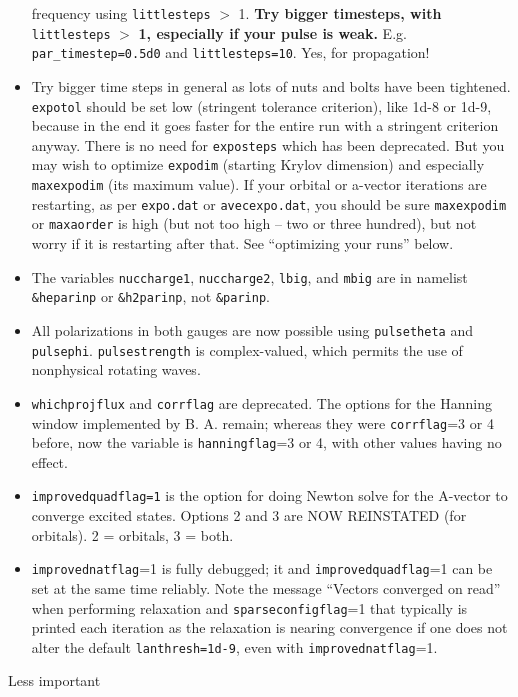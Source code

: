 \documentclass[10pt,leqno, oneside]{book}
\begin{document}
\begin{itemize}
{frequency using
\verb#littlesteps# $>$ 1. \textbf{Try bigger timesteps, with }\verb#littlesteps# $\mathbf{>}$\textbf{ 1, especially if your pulse is weak.} 
E.g. \verb#par_timestep=0.5d0# and \verb#littlesteps=10#.  Yes, for propagation!}
%
\item{ 
Try bigger time steps in general as lots of nuts and bolts have been tightened.  \verb#expotol# should be set low (stringent tolerance criterion), like 1d-8 or 1d-9, because
in the end it goes faster for the entire run with a stringent criterion anyway.
There is no need for \verb#exposteps# which has been deprecated.  But you may wish to optimize \verb#expodim# (starting Krylov dimension) and
especially \verb#maxexpodim# (its maximum value).
  If your orbital or a-vector iterations are restarting, as per \verb#expo.dat# or \verb#avecexpo.dat#, 
  you should be sure \verb#maxexpodim# or \verb#maxaorder# is high (but not too 
  high -- two or three hundred), but not worry if it is restarting after that.  See ``optimizing your runs'' below.}
%
\item{The variables \verb#nuccharge1#, \verb#nuccharge2#, \verb#lbig#, and \verb#mbig# are in namelist \verb#&heparinp# or \verb#&h2parinp#,
not \verb#&parinp#.}
%
\item{All polarizations in both gauges are now possible using \verb#pulsetheta# and \verb#pulsephi#.  \verb#pulsestrength# is complex-valued, which 
permits the use of nonphysical rotating waves.}
%
\item{\verb#whichprojflux# and \verb#corrflag# are deprecated.  The options for the Hanning window implemented by B. A. remain; 
whereas they were \verb#corrflag#=3 or 4 before, now the variable is \verb#hanningflag#=3 or 4, with other values having no effect.}
%
\item{\verb#improvedquadflag=1# is the option for doing Newton solve for the A-vector to converge excited states.  Options 2 and 3 are NOW REINSTATED (for orbitals).  2 = orbitals, 3 = both.}
\item{\verb#improvednatflag#=1 is fully debugged; it 
and \verb#improvedquadflag#=1 can be set at the same time reliably.  Note the message ``Vectors converged on read'' when performing
relaxation and \verb#sparseconfigflag#=1 that typically is printed each iteration as the relaxation is nearing convergence if one does
not alter the default \verb#lanthresh=1d-9#, even with \verb#improvednatflag#=1.}
%
\end{itemize}
%
Less important
\end{document}
